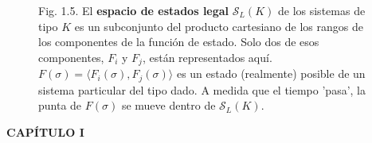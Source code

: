 {\begin{figure}[h!]
    \centering
    \caption*{Fig. 1.5. El \textbf{espacio de estados legal} $\mathcal{S}_L(K)$ de los sistemas de tipo $K$ es un subconjunto del producto cartesiano de los rangos de los componentes de la función de estado. Solo dos de esos componentes, $F_i$ y $F_j$, están representados aquí. $F(\sigma) = \langle F_i(\sigma), F_j(\sigma) \rangle$ es un estado (realmente) posible de un sistema particular del tipo dado. A medida que el tiempo 'pasa', la punta de $F(\sigma)$ se mueve dentro de $\mathcal{S}_L(K)$.}
\end{figure}
}

\newpage
\fancyhf{}
\fancyhead[l]{\thepage}
\begin{center}
{\fontsize{13}{16}\selectfont \textbf{CAPÍTULO I}}
\end{center}
\vspace{0.5cm}

